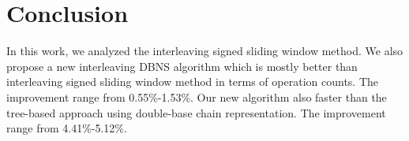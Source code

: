 \section{Conclusion}

In this work, we analyzed the interleaving signed sliding window method.
We also propose a new interleaving DBNS algorithm which is mostly better than
interleaving signed sliding window method in terms of operation counts.
The improvement range from 0.55\%-1.53\%.
Our new algorithm also faster than the tree-based approach using double-base chain representation.
The improvement range from 4.41\%-5.12\%.






